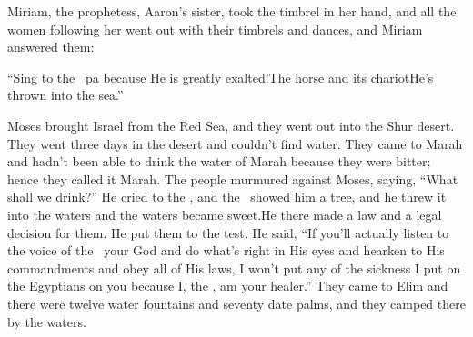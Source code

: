 \begin{inparaenum}
   Miriam, the prophetess, Aaron's sister, took the timbrel in her hand, and all the women following her went out with their timbrels and dances,%
   and Miriam answered them:\smallskip%
  
  \pb ``Sing to the \lord\ pa because He is greatly exalted!\pa The horse and its chariot\pa He's thrown into the sea.''%
  
   Moses brought Israel from the Red Sea, and they went out into the Shur desert. They went three days in the desert and couldn't find water.%
   They came to Marah and hadn't been able to drink the water of Marah because they were bitter; hence they called it Marah.%
   The people murmured against Moses, saying, ``What shall we drink?''%
   He cried to the \lord, and the \lord\ showed him a tree, and he threw it into the waters and the waters became sweet.\hspace*{4em}He there made a law and a legal decision for them. He put them to the test.%
   He said, ``If you'll actually listen to the voice of the \lord\ your God and do what's right in His eyes and hearken to His commandments and obey all of His laws, I won't put any of the sickness I put on the Egyptians on you because I, the \lord, am your healer.''%
   They came to Elim and there were twelve water fountains and seventy date palms, and they camped there by the waters.%
\end{inparaenum}
